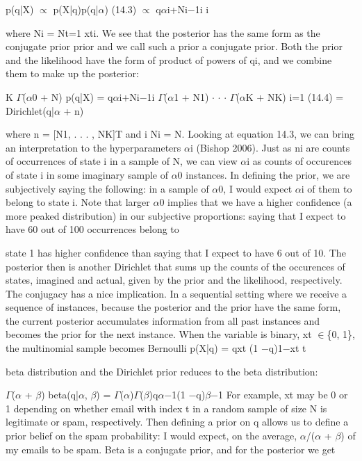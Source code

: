 p(q|X) $\propto$ p(X|q)p(q|$\alpha$) (14.3) $\propto$ q$\alpha$i+Ni$-$1i i

where Ni = Nt=1 xti. We see that the posterior has the same form as the conjugate prior prior and we call such a prior a conjugate prior. Both the prior and the likelihood have the form of product of powers of qi, and we combine them to make up the posterior:

K $\Gamma$($\alpha$0 + N) p(q|X) = q$\alpha$i+Ni$-$1i $\Gamma$($\alpha$1 + N1) $\cdot$ $\cdot$ $\cdot$ $\Gamma$($\alpha$K + NK) i=1 (14.4) = Dirichlet(q|$\alpha$ + n)

where n = [N1, . . . , NK]T and i Ni = N. Looking at equation 14.3, we can bring an interpretation to the hyperparameters $\alpha$i (Bishop 2006). Just as ni are counts of occurrences of state i in a sample of N, we can view $\alpha$i as counts of occurences of state i in some imaginary sample of $\alpha$0 instances. In defining the prior, we are subjectively saying the following: in a sample of $\alpha$0, I would expect $\alpha$i of them to belong to state i. Note that larger $\alpha$0 implies that we have a higher confidence (a more peaked distribution) in our subjective proportions: saying that I expect to have 60 out of 100 occurrences belong to

state 1 has higher confidence than saying that I expect to have 6 out of 10. The posterior then is another Dirichlet that sums up the counts of the occurences of states, imagined and actual, given by the prior and the likelihood, respectively. The conjugacy has a nice implication. In a sequential setting where we receive a sequence of instances, because the posterior and the prior have the same form, the current posterior accumulates information from all past instances and becomes the prior for the next instance. When the variable is binary, xt $\in$\{0, 1\}, the multinomial sample becomes Bernoulli p(X|q) = qxt (1 $-$q)1$-$xt t

beta distribution and the Dirichlet prior reduces to the beta distribution:

$\Gamma$($\alpha$ + $\beta$) beta(q|$\alpha$, $\beta$) = $\Gamma$($\alpha$)$\Gamma$($\beta$)q$\alpha$$-$1(1 $-$q)$\beta$$-$1 For example, xt may be 0 or 1 depending on whether email with index t in a random sample of size N is legitimate or spam, respectively. Then defining a prior on q allows us to define a prior belief on the spam probability: I would expect, on the average, $\alpha$/($\alpha$ + $\beta$) of my emails to be spam. Beta is a conjugate prior, and for the posterior we get

